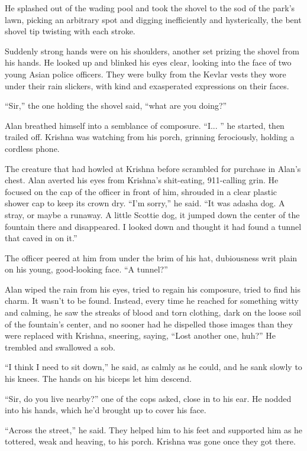 He splashed out of the wading pool and took the shovel to the sod of
the park's lawn, picking an arbitrary spot and digging inefficiently
and hysterically, the bent shovel tip twisting with each stroke.

Suddenly strong hands were on his shoulders, another set prizing the
shovel from his hands.  He looked up and blinked his eyes clear,
looking into the face of two young Asian police officers.  They were
bulky from the Kevlar vests they wore under their rain slickers, with
kind and exasperated expressions on their faces.

``Sir,'' the one holding the shovel said, ``what are you doing?''

Alan breathed himself into a semblance of composure.  ``I...  '' he
started, then trailed off.  Krishna was watching from his porch,
grinning ferociously, holding a cordless phone.

The creature that had howled at Krishna before scrambled for purchase
in Alan's chest.  Alan averted his eyes from Krishna's shit-eating,
911-calling grin.  He focused on the cap of the officer in front of
him, shrouded in a clear plastic shower cap to keep its crown dry. 
``I'm sorry,'' he said.  ``It was adash{}a dog.  A stray, or maybe a
runaway.  A little Scottie dog, it jumped down the center of the
fountain there and disappeared.  I looked down and thought it had
found a tunnel that caved in on it.''

The officer peered at him from under the brim of his hat, dubiousness
writ plain on his young, good-looking face.  ``A tunnel?''

Alan wiped the rain from his eyes, tried to regain his composure,
tried to find his charm.  It wasn't to be found.  Instead, every time
he reached for something witty and calming, he saw the streaks of
blood and torn clothing, dark on the loose soil of the fountain's
center, and no sooner had he dispelled those images than they were
replaced with Krishna, sneering, saying, ``Lost another one, huh?'' He
trembled and swallowed a sob.

``I think I need to sit down,'' he said, as calmly as he could, and he
sank slowly to his knees.  The hands on his biceps let him descend.

``Sir, do you live nearby?'' one of the cops asked, close in to his
ear.  He nodded into his hands, which he'd brought up to cover his
face.

``Across the street,'' he said.  They helped him to his feet and
supported him as he tottered, weak and heaving, to his porch.  Krishna
was gone once they got there.

